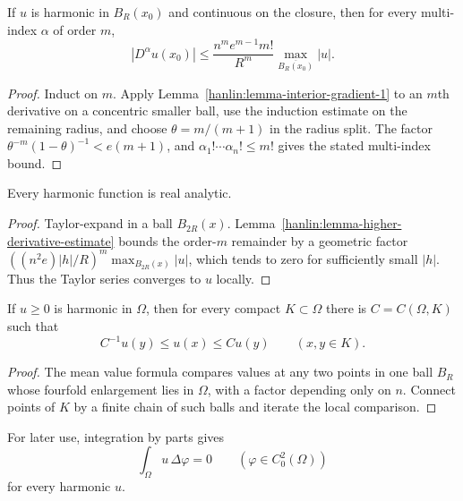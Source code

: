 \begin{lemma}\label{hanlin:lemma-higher-derivative-estimate}
If $u$ is harmonic in $B_R(x_0)$ and continuous on the closure, then for every
multi-index $\alpha$ of order $m$,
\[
|D^\alpha u(x_0)|\le\frac{n^m e^{m-1}m!}{R^m}
\max_{\overline{B_R(x_0)}}|u|.
\]
\end{lemma}
\begin{proof}
\sketch Induct on $m$. Apply Lemma~\ref{hanlin:lemma-interior-gradient-1} to an
$m$th derivative on a concentric smaller ball, use the induction estimate on
the remaining radius, and choose $\theta=m/(m+1)$ in the radius split. The
factor $\theta^{-m}(1-\theta)^{-1}<e(m+1)$, and
$\alpha_1!\cdots\alpha_n!\le m!$ gives the stated multi-index bound.
\end{proof}

\begin{theorem}\label{hanlin:thm-harmonic-analytic}
Every harmonic function is real analytic.
\end{theorem}
\begin{proof}
\sketch Taylor-expand in a ball $B_{2R}(x)$. Lemma~\ref{hanlin:lemma-higher-derivative-estimate}
bounds the order-$m$ remainder by a geometric factor
$((n^2e)|h|/R)^m\max_{B_{2R}(x)}|u|$, which tends to zero for sufficiently small
$|h|$. Thus the Taylor series converges to $u$ locally.
\end{proof}

\begin{theorem}\label{hanlin:thm-harnack}
If $u\ge0$ is harmonic in $\Omega$, then for every compact $K\subset\Omega$ there
is $C=C(\Omega,K)$ such that
\[
C^{-1}u(y)\le u(x)\le Cu(y)\qquad(x,y\in K).
\]
\end{theorem}
\begin{proof}
\sketch The mean value formula compares values at any two points in one ball
$B_R$ whose fourfold enlargement lies in $\Omega$, with a factor depending
only on $n$. Connect points of $K$ by a finite chain of such balls and iterate
the local comparison.
\end{proof}

For later use, integration by parts gives
\[
\int_\Omega u\,\Delta\varphi=0\qquad(\varphi\in C_0^2(\Omega))
\]
for every harmonic $u$.

